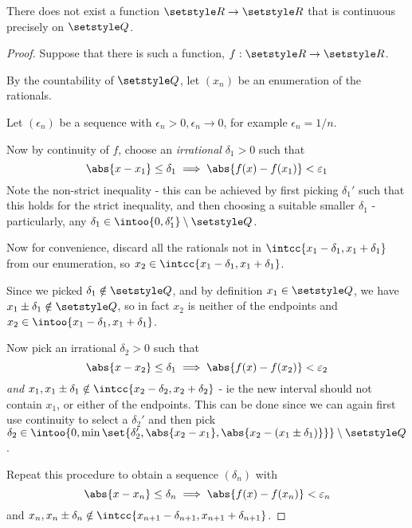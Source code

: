 \documentclass[fleqn,a4paper,11pt]{article}
\begin{document}
 \begin{theorem}
  There does not exist a function \(\R \to \R\) that is continuous precisely on
  \(\Q\).
 \end{theorem}
 \begin{proof}
  Suppose that there is such a function, \(f: \R \to \R\).

  By the countability of \(\Q\), let \((x_n)\) be an enumeration of the
  rationals.

  Let \((\epsilon_n)\) be a sequence with
  \(\epsilon_n > 0, \epsilon_n \to 0\), for example \(\epsilon_n = 1/n\).

  Now by continuity of \(f\), choose an \emph{irrational}
  \(\delta_1 > 0\) such that
  \begin{equation*}
   \abs{x - x_1} \le \delta_1 \implies \abs{f(x) - f(x_1)} < \epsilon_1
  \end{equation*}
  Note the non-strict inequality - this can be achieved by first picking
  \(\delta_1'\) such that this holds for the strict inequality, and then
  choosing a suitable smaller \(\delta_1\) - particularly, any
  \(\delta_1 \in \intoo{0, \delta_1'} \setminus \Q\).

  Now for convenience, discard all the rationals not in
  \(\intcc{x_1 - \delta_1, x_1 + \delta_1}\) from our enumeration, so
  \(x_2 \in \intcc{x_1 - \delta_1, x_1 + \delta_1}\).

  Since we picked \(\delta_1 \notin \Q\), and by definition \(x_1 \in \Q\), we
  have \(x_1 \pm \delta_1 \notin \Q\), so in fact \(x_2\) is neither of the
  endpoints and \(x_2 \in \intoo{x_1 - \delta_1, x_1 + \delta_1}\).

  Now pick an irrational \(\delta_2 > 0\) such that
  \begin{equation*}
   \abs{x - x_2} \le \delta_1 \implies \abs{f(x) - f(x_2)} < \epsilon_2
  \end{equation*}
  \emph{and}
  \(x_1, x_1 \pm \delta_1 \notin \intcc{x_2 - \delta_2, x_2 + \delta_2}\) -
  ie the new interval should not contain \(x_1\), or either of the endpoints.
  This can be done since we can again first use continuity to select a
  \(\delta_2'\) and then pick
  \(\delta_2 \in \intoo{0,
                        \min
                         \set{\delta_2',
                              \abs{x_2 - x_1},
                              \abs{x_2 - (x_1 \pm \delta_1)}}} \setminus \Q\).

  Repeat this procedure to obtain a sequence \((\delta_n)\) with
  \begin{equation*}
   \abs{x - x_n} \le \delta_n \implies \abs{f(x) - f(x_n)} < \epsilon_n
  \end{equation*}
  and
  \(x_n, x_n \pm \delta_n
    \notin \intcc{x_{n + 1} - \delta_{n + 1}, x_{n + 1} + \delta_{n + 1}}\).


\end{proof}
\end{document}
